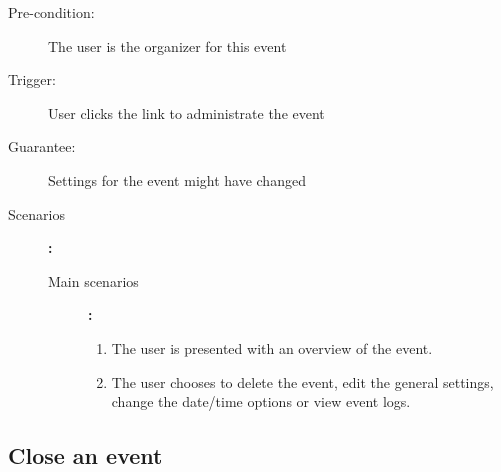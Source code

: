 \begin{description}
	\item[Pre-condition:] The user is the organizer for this event
	\item[Trigger:] User clicks the link to administrate the event
	\item[Guarantee:] Settings for the event might have changed
	\item[Scenarios]\textbf{:}\\
				\begin{description}
					\item[Main scenarios]\textbf{:}\\
								\begin{enumerate}
									\item The user is presented with an overview of the event.
									\item The user chooses to delete the event, edit the general settings, change the date/time options or view event logs.
								\end{enumerate}
				\end{description}
\end{description}

\subsection{Close an event}

